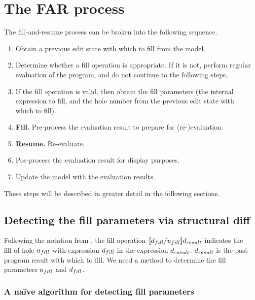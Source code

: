 \section{The FAR process}
\label{sec:far-process}

The fill-and-resume process can be broken into the following sequence.

\begin{enumerate}
\item Obtain a previous edit state with which to fill from the model.
\item Determine whether a fill operation is appropriate. If it is not, perform regular evaluation of the program, and do not continue to the following steps.
\item If the fill operation is valid, then obtain the fill parameters (the internal expression to fill, and the hole number from the previous edit state with which to fill).
\item \textbf{Fill.} Pre-process the evaluation result to prepare for (re-)evaluation.
\item \textbf{Resume.} Re-evaluate.
\item Pos-process the evaluation result for display purposes.
\item Update the model with the evaluation results.
\end{enumerate}

These steps will be described in greater detail in the following sections.

\subsection{Detecting the fill parameters via structural diff}
\label{sec:obtaining-fill-parameters}

Following the notation from \cite{conf/popl/HazelnutLive19}, the fill operation $\llbracket{}d_{fill}/u_{fill}\rrbracket{}d_{result}$ indicates the fill of hole $u_{fill}$ with expression $d_{fill}$ in the expression $d_{result}$. $d_{result}$ is the past program result with which to fill. We need a method to determine the fill parameters $u_{fill}$ and $d_{fill}$.

\subsubsection{A na\"ive algorithm for detecting fill parameters}
\label{sec:far-detect-naive}


